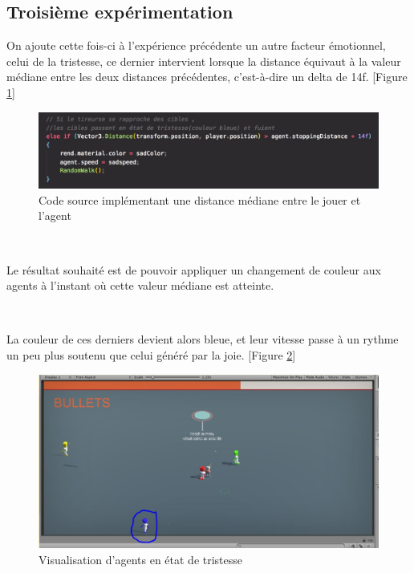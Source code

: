 \subsection{Troisième expérimentation}

On ajoute cette fois-ci à l'expérience précédente un autre facteur émotionnel, celui de la tristesse, ce dernier intervient lorsque la distance équivaut à la valeur médiane entre les deux distances précédentes, c’est-à-dire un delta de 14f. [Figure \ref{fig:333f}]


\begin{figure}[th]
\centering
\includegraphics{Figures/333f.JPG}
\decoRule
\caption[Code source implémentant une distance médiane]{Code source implémentant une distance médiane entre le jouer et l'agent}
\label{fig:333f}
\end{figure}

~\par
Le résultat souhaité est de pouvoir appliquer un changement de couleur aux agents à l’instant où cette valeur médiane est atteinte. 


~\par
La couleur de ces derniers devient alors bleue, et leur vitesse passe à un rythme un peu plus soutenu que celui généré par la joie. [Figure \ref{fig:bichi3}]

\begin{figure}[th]
\centering
\includegraphics{Figures/bleu.JPG}
\decoRule
\caption[Visualisation d'agents en état de tristesse]{Visualisation d'agents en état de tristesse}
\label{fig:bichi3}
\end{figure}


